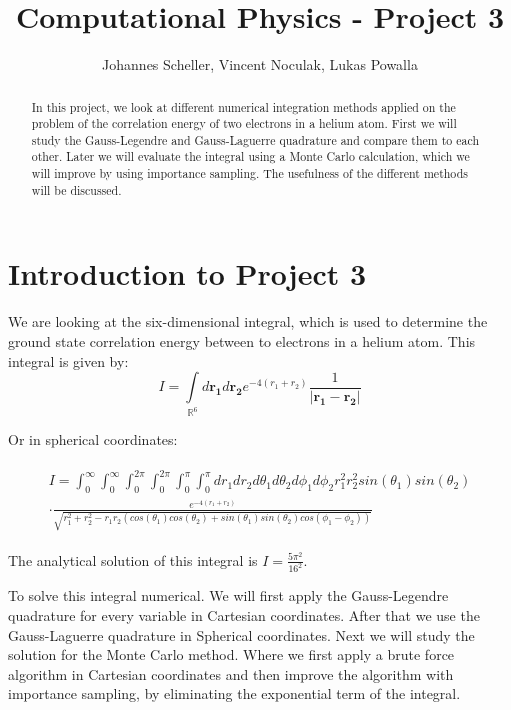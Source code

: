 \documentclass[10pt,a4paper]{article}
\author{Johannes Scheller, Vincent Noculak, Lukas Powalla}
\title{Computational Physics - Project 3}
\begin{document}
\maketitle
\newpage
\tableofcontents
\newpage

\begin{abstract}
		
	In this project, we look at different numerical integration methods applied on the problem of the correlation energy of two electrons in a helium atom. First we will study the Gauss-Legendre and Gauss-Laguerre quadrature and compare them to each other. Later we will evaluate the integral using a Monte Carlo calculation, which we will improve by using importance sampling. The usefulness of the different methods will be discussed.
	
\end{abstract}
	
\section{Introduction to Project 3}

We are looking at the six-dimensional integral, which is used to determine the ground state correlation energy between to electrons in a helium atom. This integral is given by: 
\begin{equation}
	I = \int\limits_{\mathbb{R}^6} d\mathbf{r_1} d\mathbf{r_2} e^{-4 (r_1+r_2)} \frac{1}{|\mathbf{r_1} - \mathbf{r_2}|} 
\end{equation}

Or in spherical coordinates:

\begin{align}
	\begin{split}
		I = \int_0^\infty \int_0^\infty  \int_0^{2 \pi} \int_0^{2 \pi}  \int_0^\pi \int_0^\pi dr_1 dr_2 d\theta_1 d\theta_2 d\phi_1 d\phi_2    r_1^2 r_2^2 sin(\theta_1) sin(\theta_2)\\ \cdot \frac{e^{-4(r_1+r_2)}} {\sqrt{r_1^2+r_2^2-r_1r_2(cos(\theta_1)cos(\theta_2)+sin(\theta_1)sin(\theta_2)cos(\phi_1-\phi_2))}}
	\end{split}
\end{align}

The analytical solution of this integral is $I = \frac{5 \pi^2}{16^2}$.

To solve this integral numerical. We will first apply the Gauss-Legendre quadrature for every variable in Cartesian coordinates. After that we use the Gauss-Laguerre quadrature in Spherical coordinates. Next we will study the solution for the Monte Carlo method. Where we first apply a brute force algorithm in Cartesian coordinates and then improve the algorithm with importance sampling, by eliminating the exponential term of the integral.
\end{document}
